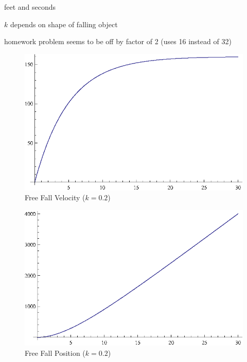 \documentclass{exam}
\begin{document}
  \begin{itemize*}
    \item feet and seconds
    \item $k$ depends on shape of falling object
    \item homework problem seems to be off by factor of 2 (uses 16 instead of 32)
  \end{itemize*}

  \begin{figure}[h]
    \centering
    \includegraphics[scale=0.9]{freeFallVelocity.eps}
    \caption{Free Fall Velocity ($k = 0.2$)}
  \end{figure}

  \begin{figure}[h]
    \centering
    \includegraphics[scale=0.9]{freeFallPosition.eps}
    \caption{Free Fall Position ($k = 0.2$)}
  \end{figure}
\end{document}
